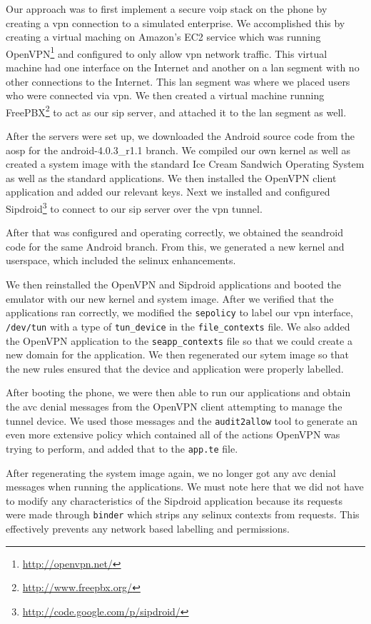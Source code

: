 Our approach was to first implement a secure \ac{voip} stack on the phone by creating a \ac{vpn} connection to a simulated enterprise.
We accomplished this by creating a virtual maching on Amazon's EC2 service which was running OpenVPN\footnote{\url{http://openvpn.net/}} and configured to only allow \ac{vpn} network traffic.
This virtual machine had one interface on the Internet and another on a \ac{lan} segment with no other connections to the Internet.
This \ac{lan} segment was where we placed users who were connected via \ac{vpn}.
We then created a virtual machine running FreePBX\footnote{\url{http://www.freepbx.org/}} to act as our \ac{sip} server, and attached it to the \ac{lan} segment as well.

After the servers were set up, we downloaded the Android source code from the \ac{aosp} for the android-4.0.3\_r1.1 branch.
We compiled our own kernel as well as created a system image with the standard Ice Cream Sandwich Operating System as well as the standard applications.
We then installed the OpenVPN client application and added our relevant keys.
Next we installed and configured Sipdroid\footnote{\url{http://code.google.com/p/sipdroid/}} to connect to our \ac{sip} server over the \ac{vpn} tunnel.

After that was configured and operating correctly, we obtained the \ac{seandroid} code for the same Android branch.
From this, we generated a new kernel and userspace, which included the \ac{selinux} enhancements.

We then reinstalled the OpenVPN and Sipdroid applications and booted the emulator with our new kernel and system image.
After we verified that the applications ran correctly, we modified the \verb=sepolicy= to label our \ac{vpn} interface, \verb=/dev/tun= with a type of \verb=tun_device= in the \verb=file_contexts= file.
We also added the OpenVPN application to the \verb=seapp_contexts= file so that we could create a new domain for the application.
We then regenerated our sytem image so that the new rules ensured that the device and application were properly labelled.

After booting the phone, we were then able to run our applications and obtain the \ac{avc} denial messages from the OpenVPN client attempting to manage the tunnel device.
We used those messages and the \verb=audit2allow= tool to generate an even more extensive policy which contained all of the actions OpenVPN was trying to perform, and added that to the \verb=app.te= file.

After regenerating the system image again, we no longer got any \ac{avc} denial messages when running the applications.
We must note here that we did not have to modify any characteristics of the Sipdroid application because its requests were made through \verb=binder= which strips any \ac{selinux} contexts from requests.
This effectively prevents any network based labelling and permissions.
